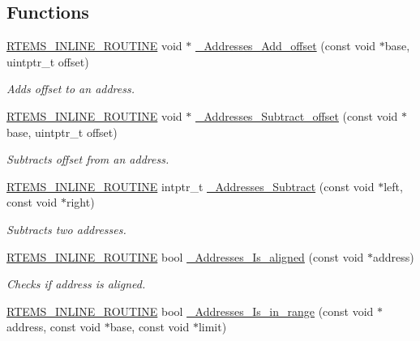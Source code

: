 \subsection*{Functions}
\begin{DoxyCompactItemize}
\item 
\mbox{\hyperlink{group__RTEMSScoreBaseDefs_gac216239df231d5dbd15e3520b0b9313f}{R\+T\+E\+M\+S\+\_\+\+I\+N\+L\+I\+N\+E\+\_\+\+R\+O\+U\+T\+I\+NE}} void $\ast$ \mbox{\hyperlink{group__RTEMSScoreAddress_gaa7812bb29c95ed68f2b958d833c79399}{\+\_\+\+Addresses\+\_\+\+Add\+\_\+offset}} (const void $\ast$base, uintptr\+\_\+t offset)
\begin{DoxyCompactList}\small\item\em Adds offset to an address. \end{DoxyCompactList}\item 
\mbox{\hyperlink{group__RTEMSScoreBaseDefs_gac216239df231d5dbd15e3520b0b9313f}{R\+T\+E\+M\+S\+\_\+\+I\+N\+L\+I\+N\+E\+\_\+\+R\+O\+U\+T\+I\+NE}} void $\ast$ \mbox{\hyperlink{group__RTEMSScoreAddress_gaf1cfd1def15609368e43e14154b9bf08}{\+\_\+\+Addresses\+\_\+\+Subtract\+\_\+offset}} (const void $\ast$base, uintptr\+\_\+t offset)
\begin{DoxyCompactList}\small\item\em Subtracts offset from an address. \end{DoxyCompactList}\item 
\mbox{\hyperlink{group__RTEMSScoreBaseDefs_gac216239df231d5dbd15e3520b0b9313f}{R\+T\+E\+M\+S\+\_\+\+I\+N\+L\+I\+N\+E\+\_\+\+R\+O\+U\+T\+I\+NE}} intptr\+\_\+t \mbox{\hyperlink{group__RTEMSScoreAddress_ga35c4fc0bbdd945fa468c3b8b268005cd}{\+\_\+\+Addresses\+\_\+\+Subtract}} (const void $\ast$left, const void $\ast$right)
\begin{DoxyCompactList}\small\item\em Subtracts two addresses. \end{DoxyCompactList}\item 
\mbox{\hyperlink{group__RTEMSScoreBaseDefs_gac216239df231d5dbd15e3520b0b9313f}{R\+T\+E\+M\+S\+\_\+\+I\+N\+L\+I\+N\+E\+\_\+\+R\+O\+U\+T\+I\+NE}} bool \mbox{\hyperlink{group__RTEMSScoreAddress_gac1cff04acb72a4eb262d66f9cd1c4d6d}{\+\_\+\+Addresses\+\_\+\+Is\+\_\+aligned}} (const void $\ast$address)
\begin{DoxyCompactList}\small\item\em Checks if address is aligned. \end{DoxyCompactList}\item 
\mbox{\hyperlink{group__RTEMSScoreBaseDefs_gac216239df231d5dbd15e3520b0b9313f}{R\+T\+E\+M\+S\+\_\+\+I\+N\+L\+I\+N\+E\+\_\+\+R\+O\+U\+T\+I\+NE}} bool \mbox{\hyperlink{group__RTEMSScoreAddress_gac07d321e2f6d5fcabd2b0417bfa2f56e}{\+\_\+\+Addresses\+\_\+\+Is\+\_\+in\+\_\+range}} (const void $\ast$address, const void $\ast$base, const void $\ast$limit)

\end{DoxyCompactItemize}
